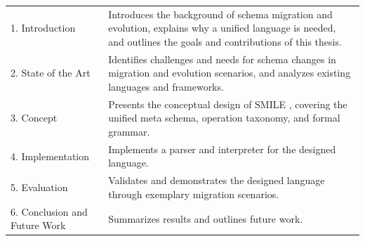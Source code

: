\vspace{1em}
\begin{longtable}{@{}p{5.5cm}p{8cm}@{}}
1. Introduction & Introduces the background of schema migration and evolution, explains why a unified language is needed, and outlines the goals and contributions of this thesis. \\[1em]
2. State of the Art & Identifies challenges and needs for schema changes in migration and evolution scenarios, and analyzes existing languages and frameworks. \\[1em]
3. Concept & Presents the conceptual design of SMILE , covering the unified meta schema, operation taxonomy, and formal grammar. \\[1em]
4. Implementation & Implements a parser and interpreter for the designed language. \\[1em]
5. Evaluation & Validates and demonstrates the designed language through exemplary migration scenarios. \\[1em]
6. Conclusion and Future Work & Summarizes results and outlines future work. \\
\end{longtable}


